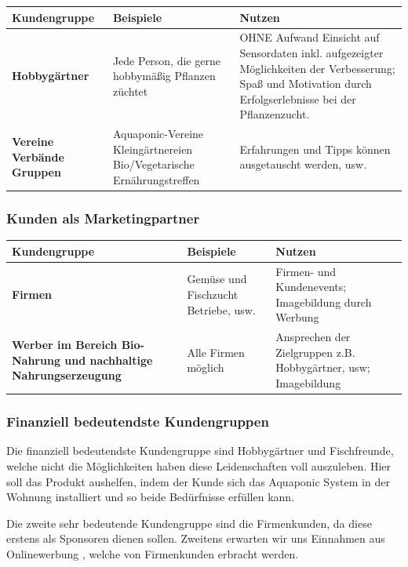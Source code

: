 \documentclass[11pt]{article}
\begin{document}
\begin{center}
\begin{tabulary}{\columnwidth}{| p{3cm} | p{4cm} | p{4.3cm} |}
\hline
\textbf{Kundengruppe} & \textbf{Beispiele} & \textbf{Nutzen}\\
\hline
\textbf{Hobbyg\"artner} & Jede Person, die gerne hobbym\"aßig Pflanzen z\"uchtet & OHNE Aufwand Einsicht auf Sensordaten inkl. aufgezeigter M\"oglichkeiten der Verbesserung; Spaß und Motivation durch Erfolgserlebnisse bei der Pflanzenzucht.\\
\hline
\textbf{Vereine Verb\"ande Gruppen} & Aquaponic-Vereine
Kleing\"artnereien
Bio/Vegetarische Ern\"ahrungstreffen & Erfahrungen und Tipps können ausgetauscht werden, usw.\\
\hline
\end{tabulary}
\end{center}

\subsubsection{Kunden als Marketingpartner}


\begin{tabulary}{\columnwidth}{| J | J | J |}
\hline
\textbf{Kundengruppe} & \textbf{Beispiele} & \textbf{Nutzen}\\
\hline
\textbf{Firmen} & Gem\"use und Fischzucht Betriebe, usw. & Firmen- und Kundenevents; Imagebildung durch Werbung \\
\hline
\textbf{Werber im Bereich Bio-Nahrung und nachhaltige Nahrungserzeugung } & Alle Firmen m\"oglich & Ansprechen der Zielgruppen z.B. Hobbyg\"artner, usw; Imagebildung\\
\hline
\end{tabulary}

\subsubsection{Finanziell bedeutendste Kundengruppen}

Die finanziell bedeutendste Kundengruppe sind Hobbyg\"artner und Fischfreunde, welche nicht
die M\"oglichkeiten haben diese Leidenschaften voll auszuleben. Hier soll
das Produkt aushelfen, indem der Kunde sich das Aquaponic System
in der Wohnung installiert und so beide Bed\"urfnisse erf\"ullen kann.

Die zweite sehr bedeutende Kundengruppe sind die Firmenkunden, da diese erstens als Sponsoren dienen sollen. Zweitens erwarten wir uns Einnahmen aus Onlinewerbung , welche von Firmenkunden erbracht werden.
\end{document}
